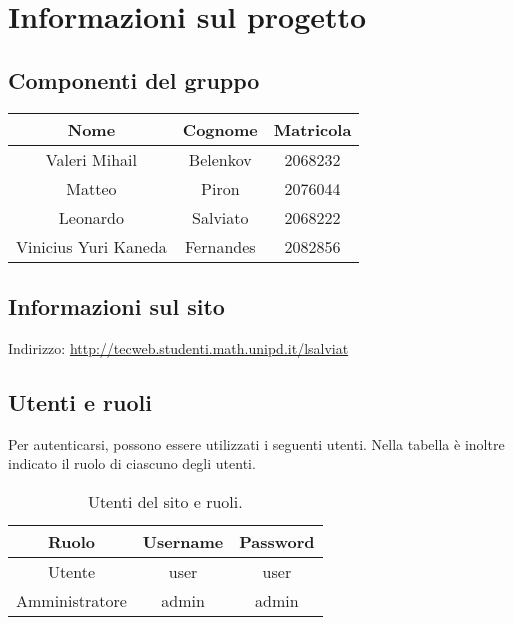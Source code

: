 \section{Informazioni sul progetto}
\subsection{Componenti del gruppo}

\begin{table}[H]
    \centering
    \begin{tabular}{|c|c|c|}
        \hline
        \cellcolor[HTML]{FFCC00} \textbf{Nome} & \cellcolor[HTML]{FFCC00} \textbf{Cognome} & \cellcolor[HTML]{FFCC00} \textbf{Matricola}  \\ 
        \hline
        Valeri Mihail & Belenkov & 2068232 \\ 
        \hline
        Matteo & Piron & 2076044\\ 
        \hline
        Leonardo & Salviato & 	2068222  \\ 
        \hline
        Vinicius Yuri Kaneda & Fernandes & 	2082856 \\ 
        \hline
    \end{tabular}
\end{table}

\subsection{Informazioni sul sito}
Indirizzo: \url{http://tecweb.studenti.math.unipd.it/lsalviat} 

\subsection{Utenti e ruoli}
Per autenticarsi, possono essere utilizzati i seguenti utenti. Nella tabella è inoltre indicato il ruolo di ciascuno degli utenti.
\begin{table}[H]
    \centering
    \begin{tabular}{|c|c|c|}
        \hline
        \cellcolor[HTML]{FFCC00} \textbf{Ruolo} & \cellcolor[HTML]{FFCC00} \textbf{Username} & \cellcolor[HTML]{FFCC00} \textbf{Password}       \\ 
        \hline
        Utente & user & user \\ 
        \hline
        Amministratore & admin & admin\\ 
        \hline
    \end{tabular}
    \caption{Utenti del sito e ruoli.}
\end{table}
